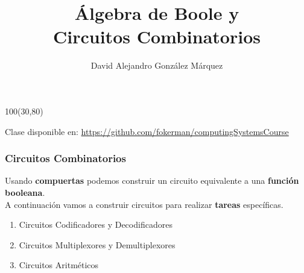 \documentclass[aspectratio=169]{beamer}
\title{\Huge Álgebra de Boole y\\ Circuitos Combinatorios}
\author{David Alejandro González Márquez}
\date{}
\begin{document}
\begin{frame}[plain]
    \titlepage
    \begin{textblock}{100}(30,80)
    \begin{tcolorbox}[size=small,width=\textwidth,colback={gray!30},title={}]
    \begin{center}
     \scriptsize Clase disponible en: \url{https://github.com/fokerman/computingSystemsCourse}
    \end{center}
    \end{tcolorbox}
    \end{textblock}
\end{frame}

\begin{frame}[fragile]
    \frametitle{Circuitos Combinatorios}
    Usando \textbf{compuertas} podemos construir un circuito equivalente a una \textbf{función booleana}.\\
    \bigskip
    A continuación vamos a construir circuitos para realizar \textbf{tareas} específicas.\\
    \bigskip
    \begin{enumerate}
     \item Circuitos Codificadores y Decodificadores
     \item Circuitos Multiplexores y Demultiplexores
     \item Circuitos Aritméticos
    \end{enumerate}
\end{frame}
\end{document}
